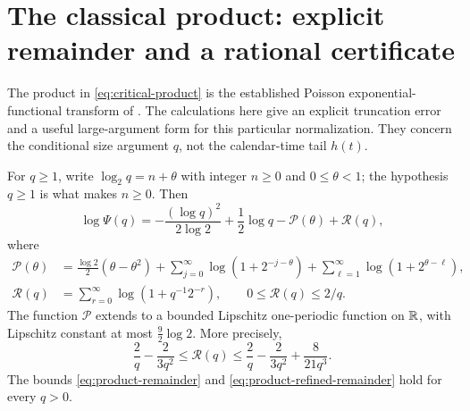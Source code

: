 \section{The classical product: explicit remainder and a rational certificate}
\label{app:product}

The product in \eqref{eq:critical-product} is the established
Poisson exponential-functional transform of
\citet{BertoinBianeYor2004}. The calculations here give an explicit
truncation error and a useful large-argument form for this particular
normalization. They concern the conditional size argument $q$,
not the calendar-time tail $h(t)$.

\begin{proposition}
\label{prop:product-periodic}
For $q\geq1$, write $\log_2q=n+\theta$ with integer $n\geq0$ and
$0\leq\theta<1$; the hypothesis $q\geq1$ is what makes $n\geq0$. Then
\begin{equation}
 \log\Psi(q)=-\frac{(\log q)^2}{2\log2}
                +\frac12\log q-\mathcal P(\theta)+\mathcal R(q),
 \label{eq:product-periodic}
\end{equation}
where
\begin{align}
 \mathcal P(\theta)
 &=\frac{\log2}{2}(\theta-\theta^2)
   +\sum_{j=0}^\infty\log(1+2^{-j-\theta})
   +\sum_{\ell=1}^\infty\log(1+2^{\theta-\ell}),
 \label{eq:product-periodic-function}\\
 \mathcal R(q)&=\sum_{r=0}^\infty\log(1+q^{-1}2^{-r}),
             \qquad 0\leq\mathcal R(q)\leq2/q.
 \label{eq:product-remainder}
\end{align}
The function $\mathcal P$ extends to a bounded Lipschitz
one-periodic function on $\mathbb R$, with Lipschitz constant at most
$\tfrac92\log2$. More precisely,
\begin{equation}
 \frac2q-\frac{2}{3q^2}\leq\mathcal R(q)
       \leq\frac2q-\frac{2}{3q^2}+\frac8{21q^3}.
 \label{eq:product-refined-remainder}
\end{equation}
The bounds \eqref{eq:product-remainder} and
\eqref{eq:product-refined-remainder} hold for every $q>0$.
\end{proposition}

